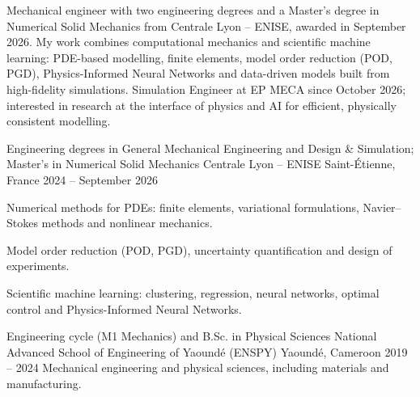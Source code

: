 \documentclass[11pt, a4paper]{awesome-cv}
\begin{document}
\makecvheader

\begin{cvparagraph}
Mechanical engineer with two engineering degrees and a Master's degree in Numerical Solid Mechanics from Centrale Lyon -- ENISE, awarded in September 2026. My work combines computational mechanics and scientific machine learning: PDE-based modelling, finite elements, model order reduction (POD, PGD), Physics-Informed Neural Networks and data-driven models built from high-fidelity simulations. Simulation Engineer at EP MECA since October 2026; interested in research at the interface of physics and AI for efficient, physically consistent modelling.
\end{cvparagraph}

\begin{cventries}
  \cventry
    {Engineering degrees in General Mechanical Engineering and Design \& Simulation; Master's in Numerical Solid Mechanics}
    {Centrale Lyon -- ENISE}
    {Saint-Étienne, France}
    {2024 -- September 2026}
    {
      \begin{cvitems}
        \item Numerical methods for PDEs: finite elements, variational formulations, Navier--Stokes methods and nonlinear mechanics.
        \item Model order reduction (POD, PGD), uncertainty quantification and design of experiments.
        \item Scientific machine learning: clustering, regression, neural networks, optimal control and Physics-Informed Neural Networks.
      \end{cvitems}
    }
  \cventry
    {Engineering cycle (M1 Mechanics) and B.Sc. in Physical Sciences}
    {National Advanced School of Engineering of Yaoundé (ENSPY)}
    {Yaoundé, Cameroon}
    {2019 -- 2024}
    {Mechanical engineering and physical sciences, including materials and manufacturing.}
\end{cventries}
\end{document}
